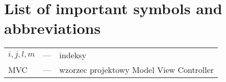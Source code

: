 \chapter*{List of important symbols and abbreviations}

\noindent
\begin{tabularx}{\textwidth}{p{1.25cm}p{0.75cm}X}
	$i, j, l, m$	& --–	& indeksy \\
	MVC				& --– 	& wzorzec projektowy Model View Controller \\
\end{tabularx}

